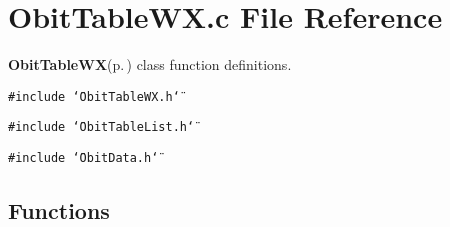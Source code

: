 \section{Obit\-Table\-WX.c File Reference}
\label{ObitTableWX_8c}
{\bf Obit\-Table\-WX}{\rm (p.\,\pageref{structObitTableWX})} class function definitions. 

{\tt \#include \char`\"{}Obit\-Table\-WX.h\char`\"{}}\par
{\tt \#include \char`\"{}Obit\-Table\-List.h\char`\"{}}\par
{\tt \#include \char`\"{}Obit\-Data.h\char`\"{}}\par
\subsection*{Functions}
